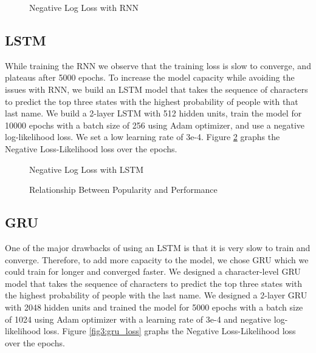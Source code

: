 \documentclass[11pt,  letterpaper]{article}
\begin{document}
\begin{figure}[ht]
  \centering
  \caption{Negative Log Loss with RNN}
  \label{fig1:rnn_loss}
\end{figure}

\subsection{LSTM}

While training the RNN we observe that the training loss is slow to converge, and plateaus after 5000 epochs. To increase the model capacity while avoiding the issues with RNN, we build an LSTM model that takes the sequence of characters to predict the top three states with the highest probability of people with that last name. We build a 2-layer LSTM with 512 hidden units, train the model for 10000 epochs with a batch size of 256 using Adam optimizer, and use a negative log-likelihood loss. We set a low learning rate of 3e-4. Figure \ref{fig2:lstm_loss} graphs the Negative Loss-Likelihood loss over the epochs.

\begin{figure}[ht]
  \centering
  \caption{Negative Log Loss with LSTM}
  \label{fig2:lstm_loss}
\end{figure}

\begin{figure}[ht]
  \centering
  \caption{Relationship Between Popularity and Performance}
  \label{fig:lstm_loss}
\end{figure}

\subsection{GRU}

One of the major drawbacks of using an LSTM is that it is very slow to train and converge. Therefore, to add more capacity to the model, we chose GRU which we could train for longer and converged faster. We designed a character-level GRU model that takes the sequence of characters to predict the top three states with the highest probability of people with the last name. We designed a 2-layer GRU with 2048 hidden units and trained the model for 5000 epochs with a batch size of 1024 using Adam optimizer with a learning rate of 3e-4 and negative log-likelihood loss. Figure \ref{fig3:gru_loss} graphs the Negative Loss-Likelihood loss over the epochs.
\end{document}
